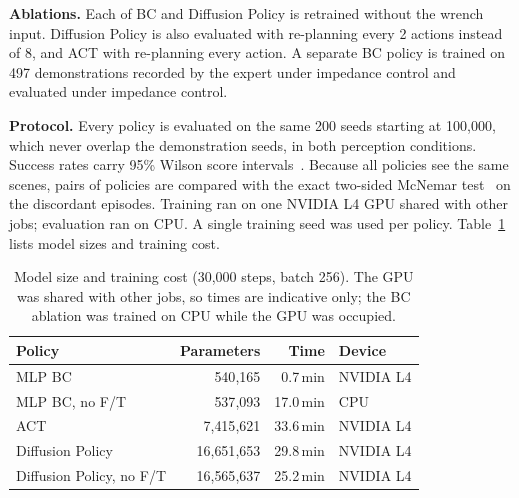 \documentclass[conference]{IEEEtran}
\begin{document}
\textbf{Ablations.} Each of BC and Diffusion Policy is retrained without the wrench input. Diffusion Policy is also evaluated with re-planning every 2 actions instead of 8, and ACT with re-planning every action. A separate BC policy is trained on 497 demonstrations recorded by the expert under impedance control and evaluated under impedance control.

\textbf{Protocol.} Every policy is evaluated on the same 200 seeds starting at 100{,}000, which never overlap the demonstration seeds, in both perception conditions. Success rates carry 95\% Wilson score intervals~\cite{wilson1927}. Because all policies see the same scenes, pairs of policies are compared with the exact two-sided McNemar test~\cite{mcnemar1947} on the discordant episodes. Training ran on one NVIDIA L4 GPU shared with other jobs; evaluation ran on CPU. A single training seed was used per policy. Table~\ref{tab:train} lists model sizes and training cost.

\begin{table}[t]
\centering
\caption{Model size and training cost (30{,}000 steps, batch 256). The GPU was shared with other jobs, so times are indicative only; the BC ablation was trained on CPU while the GPU was occupied.}
\label{tab:train}
\footnotesize
\begin{tabular}{@{}lrrl@{}}
\toprule
Policy & Parameters & Time & Device \\
\midrule
MLP BC & 540{,}165 & 0.7\,min & NVIDIA L4 \\
MLP BC, no F/T & 537{,}093 & 17.0\,min & CPU \\
ACT & 7{,}415{,}621 & 33.6\,min & NVIDIA L4 \\
Diffusion Policy & 16{,}651{,}653 & 29.8\,min & NVIDIA L4 \\
Diffusion Policy, no F/T & 16{,}565{,}637 & 25.2\,min & NVIDIA L4 \\
\bottomrule
\end{tabular}
\end{table}
\end{document}
